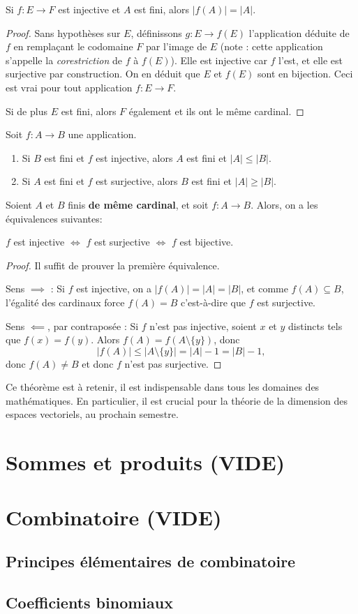 \begin{proposition}
Si $f:E\to F$ est injective et $A$ est fini, alors $|f(A)|=|A|$.
\end{proposition}
\begin{proof}
Sans hypothèses sur $E$, définissons $g : E\to f(E)$ l'application déduite de $f$ en remplaçant le codomaine $F$ par l'image de $E$ (note : cette application s'appelle la \emph{corestriction} de $f$ à $f(E)$). Elle est injective car $f$ l'est, et elle est surjective par construction. On en déduit que $E$ et $f(E)$ sont en bijection. Ceci est vrai pour tout application $f : E\to F$.

Si de plus $E$ est fini, alors $F$ également et ils ont le même cardinal.
\end{proof}

\begin{proposition}Soit $f : A\to B$ une application.
\begin{enumerate}
\item Si $B$ est fini et $f$ est injective, alors $A$ est fini et $|A|\leq |B|$.
\item Si $A$ est fini et $f$ est surjective, alors $B$ est fini et $|A|\geq |B|$.
\end{enumerate}
\end{proposition}

\begin{theoreme}[IMPORTANT]
Soient $A$ et $B$ finis \textbf{de même cardinal}, et soit $f : A\to B$. Alors, on a les équivalences suivantes:
\begin{center}
$f$ est injective $\iff$ $f$ est surjective $\iff$ $f$ est  bijective.
\end{center}
\end{theoreme}
\begin{proof}
Il suffit de prouver la première équivalence.

Sens $\implies$ : Si $f$ est injective, on a $|f(A)|=|A|=|B|$, et comme $f(A)\subseteq B$, l'égalité des cardinaux force $f(A)=B$ c'est-à-dire que $f$ est surjective.

Sens $\impliedby$, par contraposée : Si $f$ n'est pas injective, soient $x$ et $y$ distincts tels que $f(x)=f(y)$. Alors $f(A) = f(A\setminus \{y\})$, donc 
\[
|f(A)| \leq |A\setminus \{y\}| = |A|-1 = |B|-1,
\]
donc $f(A) \neq B$ et donc $f$ n'est pas surjective.
\end{proof}

Ce théorème est à retenir, il est indispensable dans tous les domaines des mathématiques. En particulier, il est crucial pour la théorie de la dimension des espaces vectoriels, au prochain semestre.

\section{Sommes et produits (VIDE)}



\section{Combinatoire (VIDE)}
\subsection{Principes élémentaires de combinatoire}
\subsection{Coefficients binomiaux}
